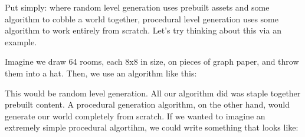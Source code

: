 \documentclass[12pt,twoside]{reedthesis}
\begin{document}
Put simply: where random level generation uses prebuilt assets and some algorithm to cobble a world together, procedural level generation uses some algorithm to work entirely from scratch. Let's try thinking about this via an example.

Imagine we draw 64 rooms, each 8x8 in size, on pieces of graph paper, and throw them into a hat.
Then, we use an algorithm like this:

\begin{algorithm}
\end{algorithm}
\newpage

This would be random level generation. All our algorithm did was staple together prebuilt content.
A procedural generation algorithm, on the other hand, would generate our world completely from scratch.
If we wanted to imagine an extremely simple procedural algortihm, we could write something that looks like:

\begin{algorithm}
\end{algorithm}
\end{document}
